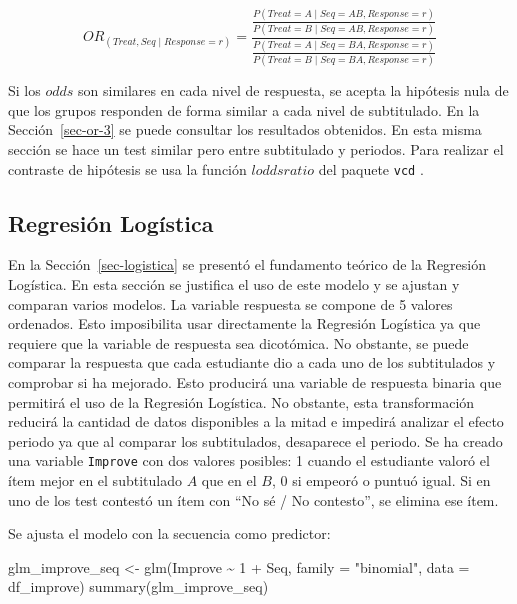 \documentclass[
  12pt,
  a4paper,
  extrafontsizes,
  onecolumn,
  openright,
  table]{memoir}
\newenvironment{Shaded}{\begin{snugshade}}{\end{snugshade}}
\newcommand{\AttributeTok}[1]{\textcolor[rgb]{0.40,0.45,0.13}{#1}}
\newcommand{\DecValTok}[1]{\textcolor[rgb]{0.68,0.00,0.00}{#1}}
\newcommand{\FunctionTok}[1]{\textcolor[rgb]{0.28,0.35,0.67}{#1}}
\newcommand{\NormalTok}[1]{\textcolor[rgb]{0.00,0.23,0.31}{#1}}
\newcommand{\OtherTok}[1]{\textcolor[rgb]{0.00,0.23,0.31}{#1}}
\newcommand{\SpecialCharTok}[1]{\textcolor[rgb]{0.37,0.37,0.37}{#1}}
\newcommand{\StringTok}[1]{\textcolor[rgb]{0.13,0.47,0.30}{#1}}
\begin{document}
\[
OR_{(Treat, Seq \mid Response=r)}=\frac{
    \frac{
            P(Treat=A \mid Seq=AB, Response=r)
        }{
            P(Treat=B \mid Seq=AB, Response=r)
        }
    }
    {\frac{
        P(Treat=A \mid Seq=BA, Response=r)
        }{
        P(Treat=B \mid Seq=BA, Response=r)
    }
}
\]

Si los \(odds\) son similares en cada nivel de respuesta, se acepta la
hipótesis nula de que los grupos responden de forma similar a cada nivel
de subtitulado. En la Sección~\ref{sec-or-3} se puede consultar los
resultados obtenidos. En esta misma sección se hace un test similar pero
entre subtitulado y periodos. Para realizar el contraste de hipótesis se
usa la función \(loddsratio\) del paquete \texttt{vcd}
\autocite[ver][]{vcd}.

\hypertarget{sec-logistica-2}{%
\subsection{Regresión Logística}\label{sec-logistica-2}}

En la Sección~\ref{sec-logistica} se presentó el fundamento teórico de
la Regresión Logística. En esta sección se justifica el uso de este
modelo y se ajustan y comparan varios modelos. La variable respuesta se
compone de 5 valores ordenados. Esto imposibilita usar directamente la
Regresión Logística ya que requiere que la variable de respuesta sea
dicotómica. No obstante, se puede comparar la respuesta que cada
estudiante dio a cada uno de los subtitulados y comprobar si ha
mejorado. Esto producirá una variable de respuesta binaria que permitirá
el uso de la Regresión Logística. No obstante, esta transformación
reducirá la cantidad de datos disponibles a la mitad e impedirá analizar
el efecto periodo ya que al comparar los subtitulados, desaparece el
periodo. Se ha creado una variable \texttt{Improve} con dos valores
posibles: 1 cuando el estudiante valoró el ítem mejor en el subtitulado
\(A\) que en el \(B\), 0 si empeoró o puntuó igual. Si en uno de los
test contestó un ítem con \enquote{No sé / No contesto}, se elimina ese
ítem.

Se ajusta el modelo con la secuencia como predictor:

\scriptsize

\begin{Shaded}
\begin{Highlighting}[]
\NormalTok{glm\_improve\_seq }\OtherTok{\textless{}{-}} \FunctionTok{glm}\NormalTok{(Improve }\SpecialCharTok{\textasciitilde{}} \DecValTok{1} \SpecialCharTok{+}\NormalTok{ Seq, }\AttributeTok{family =} \StringTok{"binomial"}\NormalTok{, }\AttributeTok{data =}\NormalTok{ df\_improve)}
\FunctionTok{summary}\NormalTok{(glm\_improve\_seq)}
\end{Highlighting}
\end{Shaded}
\end{document}
